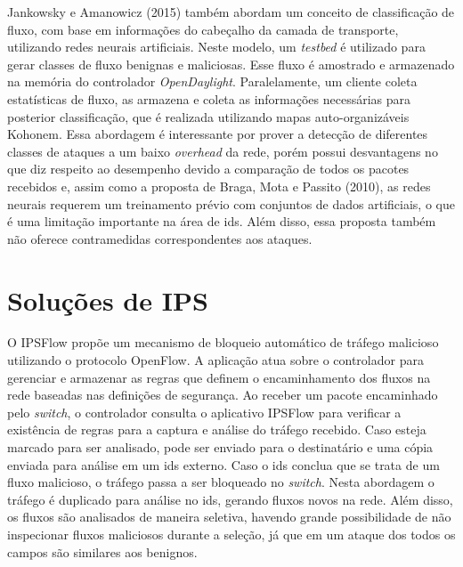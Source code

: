 Jankowsky e Amanowicz (2015)\nocite{JankowskyAmanowicz:2015}  também abordam um conceito de classificação de fluxo, com base em informações do cabeçalho da camada de transporte, utilizando redes neurais artificiais. Neste modelo, um \textit{testbed} é utilizado para gerar classes de fluxo benignas e maliciosas. Esse fluxo é amostrado e armazenado na memória do controlador \textit{OpenDaylight}. Paralelamente, um cliente coleta estatísticas de fluxo, as armazena e coleta as informações necessárias para posterior classificação, que é realizada utilizando mapas auto-organizáveis Kohonem. Essa abordagem é interessante por prover a detecção de diferentes classes de ataques a um baixo \textit{overhead} da rede, porém possui desvantagens no que diz respeito ao desempenho devido a comparação de todos os pacotes recebidos e, assim como a proposta de Braga, Mota e Passito (2010)\nocite{Braga:2010}, as redes neurais requerem um treinamento prévio com conjuntos de dados artificiais, o que é uma limitação importante na área de \gls{ids}. Além disso, essa proposta também não oferece contramedidas correspondentes aos ataques.

\section{Soluções de IPS}

O IPSFlow \cite{Nagahama:2012} propõe um mecanismo de bloqueio automático de tráfego malicioso utilizando o protocolo OpenFlow. A aplicação atua sobre o controlador para gerenciar e armazenar as regras que definem o encaminhamento dos fluxos na rede baseadas nas definições de segurança. Ao receber um pacote encaminhado pelo \textit{switch}, o controlador consulta o aplicativo IPSFlow para verificar a existência de regras para a captura e análise do tráfego recebido. Caso esteja marcado para ser analisado, pode ser enviado para o destinatário e uma cópia enviada para análise em um \gls{ids} externo. Caso o \gls{ids} conclua que se trata de um fluxo malicioso, o tráfego passa a ser bloqueado no \textit{switch}. Nesta abordagem o tráfego é duplicado para análise no \gls{ids}, gerando fluxos novos na rede. Além disso, os fluxos são analisados de maneira seletiva, havendo grande possibilidade de não inspecionar fluxos maliciosos durante a seleção, já que em um ataque \gls{dos} todos os campos são similares aos benignos.

